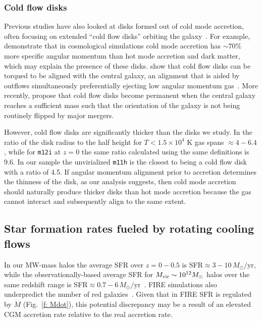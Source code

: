 \documentclass[fleqn,usenatbib]{mnras}
\newcommand{\Mdot}{\dot{M}}
\begin{document}
\subsubsection{Cold flow disks}
\label{s: other disk formation -- cold flow disks}

Previous studies have also looked at disks formed out of cold mode accretion, often focusing on extended ``cold flow disks'' orbiting the galaxy~\citep[e.g.][]{Stewart2011a}.
For example, \cite{Stewart2013} demonstrate that in cosmological simulations cold mode accretion has $\sim 70\%$ more specific angular momentum than hot mode accretion and dark matter, which may explain the presence of these disks.
\cite{Danovich2015} show that cold flow disks can be torqued to be aligned with the central galaxy, an alignment that is aided by outflows simultaneously preferentially ejecting low angular momentum gas~\citep[e.g.][]{Ubler2014}.
More recently, \cite{Dekel2019} propose that cold flow disks become permanent when the central galaxy reaches a sufficient mass such that the orientation of the galaxy is not being routinely flipped by major mergers.

However, cold flow disks are significantly thicker than the disks we study.
In \cite{Dekel2019} the ratio of the disk radius to the half height for $T < 1.5 \times 10^4$ K gas spans $\approx 4-6.4$, while for \texttt{m12i} at $z=0$ the same ratio calculated using the same definitions is 9.6.
In our sample the unvirialized \texttt{m11h} is the closest to being a cold flow disk with a ratio of 4.5.
If angular momentum alignment prior to accretion determines the thinness of the disk, as our analysis suggests, then cold mode accretion should naturally produce thicker disks than hot mode accretion because the gas cannot interact and subsequently align to the same extent.

\subsection{Star formation rates fueled by rotating cooling flows}
\label{s: fueling}

In our MW-mass halos the average SFR over $z=0-0.5$ is SFR$\approx 3-10\,M_\odot/$yr, while the observationally-based average SFR for $M_{\rm vir} \sim 10^{12} M_\odot$ halos over the same redshift range is SFR$\approx 0.7-6\,M_\odot/$yr~\citep{Behroozi2013}.
FIRE simulations also underpredict the number of red galaxies~\citep{Garrison-Kimmel2017}.
Given that in FIRE SFR is regulated by $\Mdot$ (Fig.~\ref{f: Mdot}), this potential discrepancy may be a result of an elevated CGM accretion rate relative to the real accretion rate.
\end{document}
